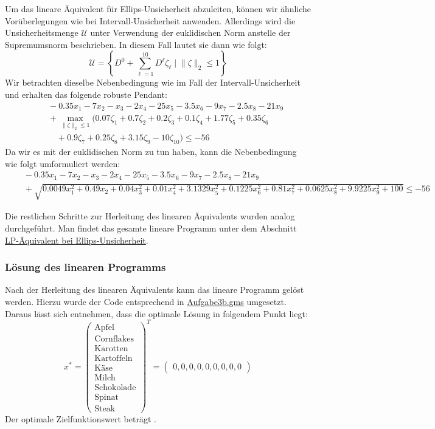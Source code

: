 \documentclass[a4paper,12pt]{article}
\begin{document}
Um das lineare \"Aquivalent f\"ur Ellips-Unsicherheit abzuleiten, k\"onnen wir \"ahnliche Vor\"uberlegungen wie bei Intervall-Unsicherheit anwenden. Allerdings wird die Unsicherheitsmenge $\mathcal{U}$ unter Verwendung der euklidischen Norm anstelle der Supremumsnorm beschrieben. In diesem Fall lautet sie dann wie folgt:
\[
\mathcal{U} = \left\{ D^0 + \sum_{\ell=1}^{10}D^{\ell} \zeta_{\ell} \;\vert\; \|\zeta\|_2 \leq 1 \right\}
\]
Wir betrachten dieselbe Nebenbedingung wie im Fall der Intervall-Unsicherheit und erhalten das folgende robuste Pendant:
\[
\begin{aligned}
    &\quad -0.35x_1 - 7x_2 - x_3 - 2x_4 - 25x_5 - 3.5x_6 - 9x_7 - 2.5x_8 - 21x_9 \\
    &\quad + \max_{\|\zeta\|_2 \leq 1} \big( 0.07\zeta_1 + 0.7\zeta_2 + 0.2\zeta_3 + 0.1\zeta_4 + 1.77\zeta_5 +  0.35\zeta_6\\
    &\qquad + 0.9\zeta_7 + 0.25\zeta_8 + 3.15\zeta_9 - 10\zeta_{10} \big) \leq -56
\end{aligned}
\]
Da wir es mit der euklidischen Norm zu tun haben, kann die Nebenbedingung wie folgt umformuliert werden:
\[
\begin{aligned}
    &\quad -0.35x_1 - 7x_2 - x_3 - 2x_4 - 25x_5 - 3.5x_6 - 9x_7 - 2.5x_8 - 21x_9 \\
    &\quad + \sqrt{0.0049x_1^2 + 0.49x_2 + 0.04x_3^2 + 0.01x_4^2 + 3.1329x_5^2 + 0.1225x_6^2 + 0.81x_7^2 + 0.0625x_8^2 + 9.9225x_9^2 + 100} \leq -56
\end{aligned}
\]

Die restlichen Schritte zur Herleitung des linearen \"Aquivalents wurden analog durchgef\"uhrt. Man findet das gesamte lineare Programm unter dem Abschnitt \hyperref[sec:lp-equivalent-ellips]{LP-\"Aquivalent bei Ellips-Unsicherheit}.

\subsubsection*{L\"osung des linearen Programms}

Nach der Herleitung des linearen \"Aquivalents kann das lineare Programm gel\"ost werden. Hierzu wurde der Code entsprechend in \href{../src/r3/Aufgabe3b.gms}{Aufgabe3b.gms} umgesetzt.
Daraus l\"asst sich entnehmen, dass die optimale L\"osung in folgendem Punkt liegt:
\[
x^* = \begin{pmatrix}
    \text{Apfel} \\ \text{Cornflakes} \\ \text{Karotten} \\ \text{Kartoffeln} \\ \text{K\"ase} \\ \text{Milch} \\ \text{Schokolade} \\ \text{Spinat} \\ \text{Steak}
    \end{pmatrix}^T
     =
     \begin{pmatrix}
     0, 0, 0, 0, 0, 0, 0, 0, 0
        \end{pmatrix}
\]
Der optimale Zielfunktionswert betr\"agt .
\end{document}
